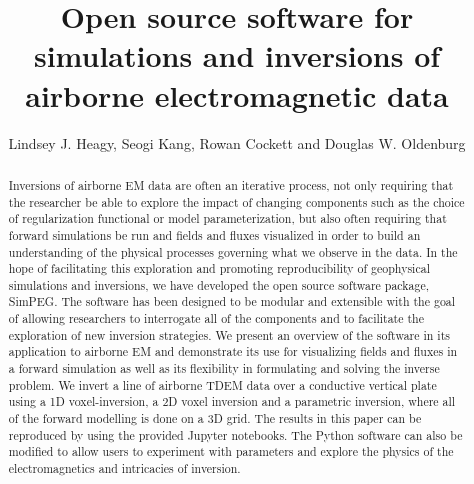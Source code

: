 \documentclass[paper]{geophysics}
\begin{document}
\title{Open source software for simulations and inversions of airborne electromagnetic data}

\renewcommand{\thefootnote}{\fnsymbol{footnote}}


\address{
\footnotemark[1]Geophyscial Inversion Facility, \\
University of British Columbia, Canada\\
BC, Vancouver}

\author{Lindsey J. Heagy\footnotemark[1], Seogi Kang, Rowan Cockett and Douglas W. Oldenburg}


\maketitle

\begin{abstract}
Inversions of airborne EM data are often an iterative process, not only requiring that the researcher be able to explore the impact of changing components such as the choice of regularization functional or model parameterization, but also often requiring that forward simulations be run and fields and fluxes visualized in order to build an understanding of the physical processes governing what we observe in the data. In the hope of facilitating this exploration and promoting reproducibility of geophysical simulations and inversions, we have developed the open source software package, SimPEG. The software has been designed to be modular and extensible with the goal of allowing researchers to interrogate all of the components and to facilitate the exploration of new inversion strategies. We present an overview of the software in its application to airborne EM and demonstrate its use for visualizing fields and fluxes in a forward simulation as well as its flexibility in formulating and solving the inverse problem. We invert a line of airborne TDEM data over a conductive vertical plate using a 1D voxel-inversion, a 2D voxel inversion and a parametric inversion, where all of the forward modelling is done on a 3D grid. The results in this paper can be reproduced  by using the provided Jupyter notebooks. The Python software can also be modified to allow users to experiment with parameters and explore the physics of the electromagnetics and intricacies of inversion.
\end{abstract}
\end{document}
